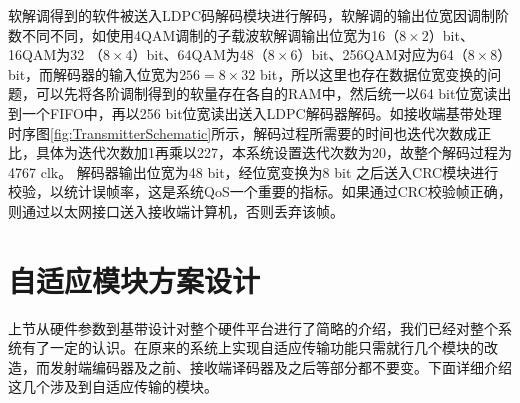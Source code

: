 软解调得到的软件被送入LDPC码解码模块进行解码，软解调的输出位宽因调制阶数不同不同，如使用4QAM调制的子载波软解调输出位宽为16（$8\times 2$）bit、16QAM为32 （$8\times 4$）bit、64QAM为48（$8\times 6$）bit、256QAM对应为64（$8\times 8$）bit，而解码器的输入位宽为$256=8\times 32$ bit，所以这里也存在数据位宽变换的问题，可以先将各阶调制得到的软量存在各自的RAM中，然后统一以64 bit位宽读出到一个FIFO中，再以256 bit位宽读出送入LDPC解码器解码。如接收端基带处理时序图\ref{fig:TransmitterSchematic}所示，解码过程所需要的时间也迭代次数成正比，具体为迭代次数加1再乘以227，本系统设置迭代次数为20，故整个解码过程为4767 clk。 解码器输出位宽为48 bit，经位宽变换为8 bit 之后送入CRC模块进行校验，以统计误帧率，这是系统QoS一个重要的指标。如果通过CRC校验帧正确，则通过以太网接口送入接收端计算机，否则丢弃该帧。


\section{自适应模块方案设计}
上节从硬件参数到基带设计对整个硬件平台进行了简略的介绍，我们已经对整个系统有了一定的认识。在原来的系统上实现自适应传输功能只需就行几个模块的改造，而发射端编码器及之前、接收端译码器及之后等部分都不要变。下面详细介绍这几个涉及到自适应传输的模块。
